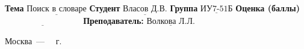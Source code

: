 \begin{titlepage}
      \noindent\textbf{Тема} $\underline{\text{Поиск в словаре}}$\newline\newline
      \noindent\textbf{Студент} $\underline{\text{Власов Д.В.}}$\newline\newline
      \noindent\textbf{Группа} $\underline{\text{ИУ7-51Б}}$\newline\newline
      \noindent\textbf{Оценка (баллы)} $\underline{\text{~~~~~~~~~~~~~~~~~~~~~~~~~~~}}$\newline\newline
      \noindent\textbf{Преподаватель: } $\underline{\text{Волкова Л.Л.}}$\newline\newline\newline
      
      \begin{center}
          \vfill
          Москва~---~\the\year
          ~г.
      \end{center}
  \end{titlepage}
  